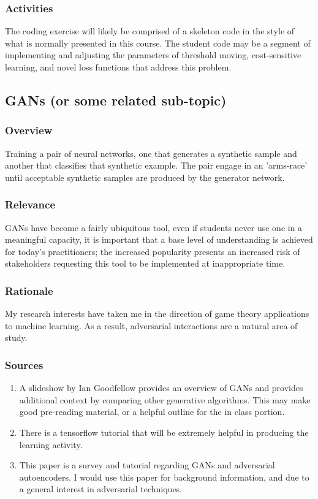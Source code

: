 \documentclass[12pt]{amsart}
\begin{document}
\subsubsection{Activities}
The coding exercise will likely be comprised of a skeleton code in the style of what 
is normally presented in this course.
The student code may be a segment of implementing and adjusting the parameters 
of threshold moving, cost-sensitive learning, and novel loss functions that address this problem.



\subsection{GANs (or some related sub-topic)}
\subsubsection{Overview}
Training a pair of neural networks, one that generates a synthetic sample and another that classifies
that synthetic example. The pair engage in an 'arms-race' until acceptable synthetic samples are
produced by the generator network.

\subsubsection{Relevance}
GANs have become a fairly ubiquitous tool, even if students never use one in a meaningful capacity,
it is important that a base level of understanding is achieved for today's practitioners;
the increased popularity presents an increased risk of stakeholders requesting this tool to be
implemented at inappropriate time.

\subsubsection{Rationale}
My research interests have taken me in the direction of game theory applications to machine learning.
As a result, adversarial interactions are a natural area of study.

\subsubsection{Sources}
\begin{enumerate}
	\item A slideshow by Ian Goodfellow \cite{} provides an overview of GANs and provides
	additional context by comparing other generative algorithms. 
	This may make good pre-reading material, or a helpful outline for the in class portion.
	\item There is a tensorflow \cite{} tutorial that will be extremely helpful in producing the 
	learning activity.
	\item This \cite{} paper is a survey and tutorial regarding GANs and adversarial autoencoders.
	I would use this paper for background information, and due to a general interest in adversarial techniques.
\end{enumerate}
\end{document}
